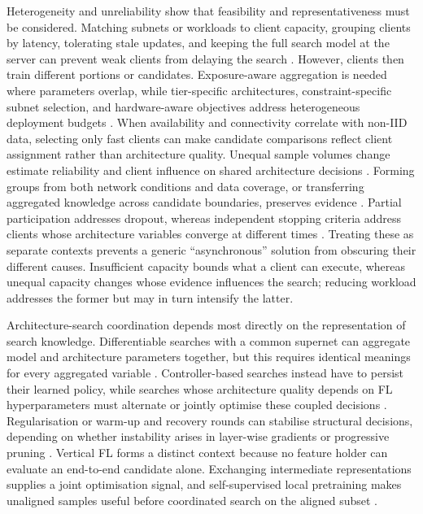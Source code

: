 Heterogeneity and unreliability show that feasibility and representativeness must be considered. Matching subnets or workloads to client capacity, grouping clients by latency, tolerating stale updates, and keeping the full search model at the server can prevent weak clients from delaying the search \cite{fedoras_2022,nasfly_2024,rl_fednas_2021,rafl_2024}. However, clients then train different portions or candidates. Exposure-aware aggregation is needed where parameters overlap, while tier-specific architectures, constraint-specific subnet selection, and hardware-aware objectives address heterogeneous deployment budgets \cite{fgfl_2024,clustered_direct_fednas_2022,superfednas_2024}. When availability and connectivity correlate with non-IID data, selecting only fast clients can make candidate comparisons reflect client assignment rather than architecture quality. Unequal sample volumes change estimate reliability and client influence on shared architecture decisions \cite{fednas_2021}. Forming groups from both network conditions and data coverage, or transferring aggregated knowledge across candidate boundaries, preserves evidence \cite{network_aware_fed_nas_2025,finch_2024,hapfnas_2025}. Partial participation addresses dropout, whereas independent stopping criteria address clients whose architecture variables converge at different times \cite{optimize_fednas_edge_2021,collaborative_nas_for_pfl_2025}. Treating these as separate contexts prevents a generic ``asynchronous'' solution from obscuring their different causes. Insufficient capacity bounds what a client can execute, whereas unequal capacity changes whose evidence influences the search; reducing workload addresses the former but may in turn intensify the latter.

Architecture-search coordination depends most directly on the representation of search knowledge. Differentiable searches with a common supernet can aggregate model and architecture parameters together, but this requires identical meanings for every aggregated variable \cite{fednas_2021,dfnas_2020}. Controller-based searches instead have to persist their learned policy, while searches whose architecture quality depends on FL hyperparameters must alternate or jointly optimise these coupled decisions \cite{efficient_model_training_fednas_2024,feathers_2023,aging_fednas_2025}. Regularisation or warm-up and recovery rounds can stabilise structural decisions, depending on whether instability arises in layer-wise gradients or progressive pruning \cite{remote_sensing_fednas_2025,spider_2021}. Vertical FL forms a distinct context because no feature holder can evaluate an end-to-end candidate alone. Exchanging intermediate representations supplies a joint optimisation signal, and self-supervised local pretraining makes unaligned samples useful before coordinated search on the aligned subset \cite{self-supervised_vertical_fednas_2023}.

